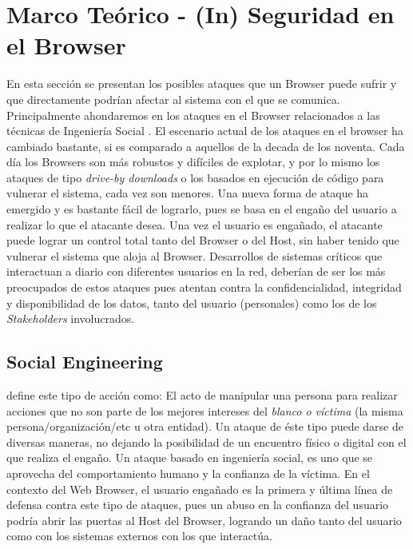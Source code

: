\chapter{Marco Teórico - (In) Seguridad en el Browser}
\label{chap3:FC}

En esta sección se presentan los posibles ataques que un Browser puede sufrir y que directamente podrían afectar al sistema con el que se comunica. Principalmente ahondaremos en los ataques en el Browser relacionados a las técnicas de Ingeniería Social \cite{socEngineeering}. El escenario actual de los ataques en el browser ha cambiado bastante, si es comparado a aquellos de la decada de los noventa. Cada día los Browsers son más robustos y difíciles de explotar, y por lo mismo los ataques de tipo \textit{drive-by downloads} o los basados en ejecución de código para vulnerar el sistema, cada vez son menores. Una nueva forma de ataque ha emergido y es bastante fácil de lograrlo, pues se basa en el engaño del usuario a realizar lo que el atacante desea. Una vez el usuario es engañado, el atacante puede lograr un control total tanto del Browser o del Host, sin haber tenido que vulnerar el sistema \cite{Rajab2013} que aloja al Browser. Desarrollos de sistemas críticos que interactuan a diario con diferentes usuarios en la red, deberían de ser los más preocupados de estos ataques pues atentan contra la confidencialidad, integridad y disponibilidad de los datos, tanto del usuario (personales) como los de los \textit{Stakeholders} involucrados.

\section{Social Engineering}
\cite{socEngineeering} define este tipo de acción como: El acto de manipular una persona para realizar acciones que no son parte de los mejores intereses del \textit{blanco o víctima} (la misma persona/organización/etc u otra entidad). Un ataque de éste tipo puede darse de diversas maneras, no dejando la posibilidad de un encuentro físico o digital con el que realiza el engaño. Un ataque basado en ingeniería social, es uno que se aprovecha del comportamiento humano y la confianza de la víctima. En el contexto del Web Browser, el usuario engañado es la primera y última línea de defensa contra este tipo de ataques, pues un abuso en la confianza del usuario podría abrir las puertas al Host del Browser, logrando un daño tanto del usuario como con los sistemas externos con los que interactúa.

